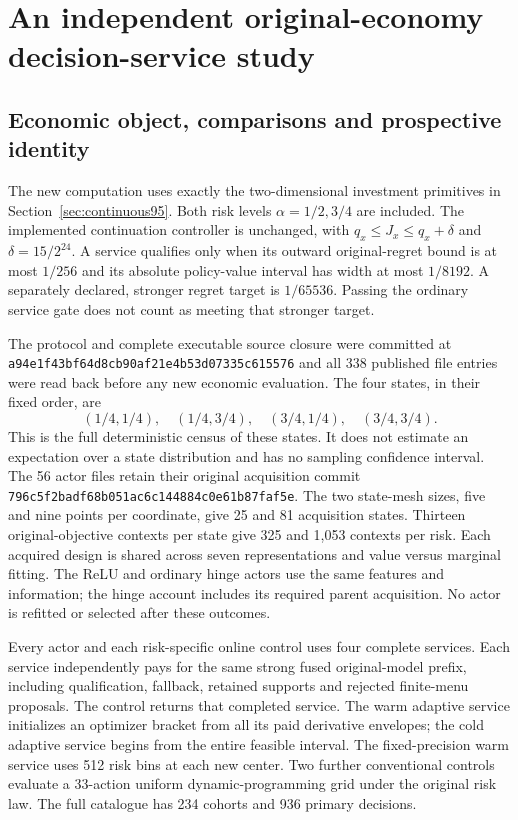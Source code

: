 \section{An independent original-economy decision-service study}
\label{sec:experiment125}

\subsection{Economic object, comparisons and prospective identity}

The new computation uses exactly the two-dimensional investment primitives
in Section~\ref{sec:continuous95}. Both risk levels $\alpha=1/2,3/4$
are included. The implemented continuation controller is unchanged, with
$q_x\le J_x\le q_x+\delta$ and $\delta=15/2^{24}$. A service qualifies
only when its outward original-regret bound is at most $1/256$ and its
absolute policy-value interval has width at most $1/8192$. A separately
declared, stronger regret target is $1/65536$. Passing the ordinary service
gate does not count as meeting that stronger target.

The protocol and complete executable source closure were committed at
\nolinkurl{a94e1f43bf64d8cb90af21e4b53d07335c615576} and all 338
published file entries were read back before any new economic evaluation.
The four states, in their fixed order, are
\[
 (1/4,1/4),\quad(1/4,3/4),\quad(3/4,1/4),\quad(3/4,3/4).
\]
This is the full deterministic census of these states. It does not estimate
an expectation over a state distribution and has no sampling confidence
interval. The 56 actor files retain their original acquisition commit
\nolinkurl{796c5f2badf68b051ac6c144884c0e61b87faf5e}. The two state-mesh sizes, five and nine points per coordinate,
give 25 and 81 acquisition states. Thirteen original-objective contexts
per state give 325 and 1,053 contexts per risk. Each acquired design
is shared across seven representations and value versus marginal fitting. The ReLU and ordinary hinge actors use the
same features and information; the hinge account includes its required
parent acquisition. No actor is refitted or selected after these outcomes.

Every actor and each risk-specific online control uses four complete
services. Each service independently pays for the same strong fused
original-model prefix, including qualification, fallback, retained
supports and rejected finite-menu proposals. The control returns that
completed service. The warm adaptive service initializes an optimizer
bracket from all its paid derivative envelopes; the cold adaptive service
begins from the entire feasible interval. The fixed-precision warm service
uses 512 risk bins at each new center. Two further conventional controls
evaluate a 33-action uniform dynamic-programming grid under the original
risk law. The full catalogue has 234 cohorts and 936 primary decisions.

